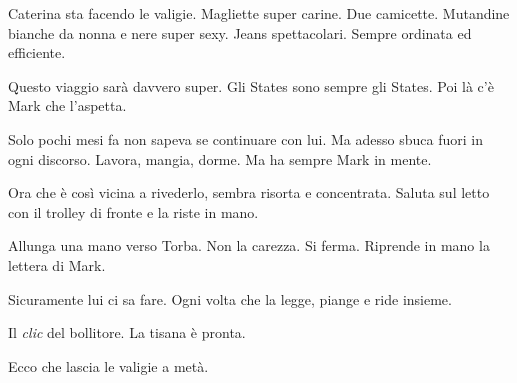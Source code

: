Caterina sta facendo le valigie.  
Magliette super carine. Due camicette.  
Mutandine bianche da nonna e nere super sexy.  
Jeans spettacolari. Sempre ordinata ed efficiente.  

Questo viaggio sarà davvero super.  
Gli States sono sempre gli States.  
Poi là c'è Mark che l'aspetta.  

Solo pochi mesi fa non sapeva se continuare con lui.  
Ma adesso sbuca fuori in ogni discorso.  
Lavora, mangia, dorme.  
Ma ha sempre Mark in mente.  

Ora che è così vicina a rivederlo, sembra risorta e concentrata.  
Saluta sul letto con il trolley di fronte e la riste in mano.  

Allunga una mano verso Torba.  
Non la carezza.  
Si ferma.  
Riprende in mano la lettera di Mark.  

Sicuramente lui ci sa fare.  
Ogni volta che la legge, piange e ride insieme.  

Il \textit{clic} del bollitore.  
La tisana è pronta.  

Ecco che lascia le valigie a metà.
